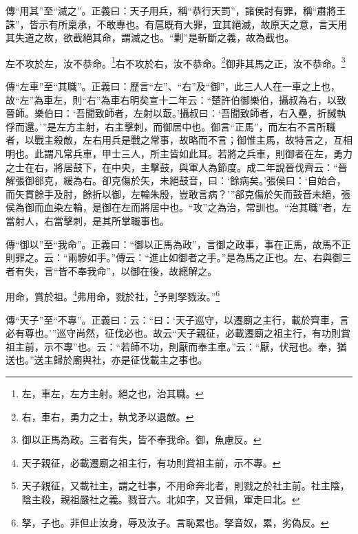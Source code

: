 {\noindent\zhuan{}\fzbyks 傳“用其”至“滅之”。正義曰：天子用兵，稱“恭行天罰”，諸侯討有罪，稱“肅將王誅”，皆示有所稟承，不敢專也。有扈既有大罪，宜其絕滅，故原天之意，言天用其失道之故，欲截絕其命，謂滅之也。“剿”是斬斷之義，故為截也。 \par}

左不攻於左，汝不恭命。\footnote{左，車左，左方主射。絕之也，治其職。}右不攻於右，汝不恭命。\footnote{右，車右，勇力之士，執戈矛以退敵。}御非其馬之正，汝不恭命。\footnote{御以正馬為政。三者有失，皆不奉我命。御，魚慮反。}


{\noindent\zhuan{}\fzbyks 傳“左車”至“其職”。正義曰：歷言“左”、“右”及“御”，此三人人在一車之上也，故“左”為車左，則“右”為車右明矣宣十二年云：“楚許伯御樂伯，攝叔為右，以致晉師。樂伯曰：‘吾聞致師者，左射以菆。’攝叔曰：‘吾聞致師者，右入壘，折馘執俘而還。’”是左方主射，右主擊刺，而御居中也。御言“正馬”，而左右不言所職者，以戰主殺敵，左右用兵是戰之常事，故略而不言；御惟主馬，故特言之，互相明也。此謂凡常兵車，甲士三人，所主皆如此耳。若將之兵車，則御者在左，勇力之士在右，將居鼓下，在中央，主擊鼓，與軍人為節度。成二年說晉伐齊云：“晉解張御郤克，緩為右。卻克傷於矢，未絕鼓音，曰：‘餘病矣。’張侯曰：‘自始合，而矢貫餘手及肘，餘折以御，左輪朱殷，豈敢言病？’”郤克傷於矢而鼓音未絕，張侯為御而血染左輪，是御在左而將居中也。“攻”之為治，常訓也。“治其職”者，左當射人，右當擊刺，是其所掌職事也。 \par}

{\noindent\zhuan{}\fzbyks 傳“御以”至“我命”。正義曰：“御以正馬為政”，言御之政事，事在正馬，故馬不正則罪之。云：“兩驂如手。”傳云：“進止如御者之手。”是為馬之正也。左、右與御三者有失，言“皆不奉我命”，以御在後，故總解之。 \par}

用命，賞於祖。\footnote{天子親征，必載遷廟之祖主行，有功則賞祖主前，示不專。}弗用命，戮於社，\footnote{天子親征，又載社主，謂之社事，不用命奔北者，則戮之於社主前。社主陰，陰主殺，親祖嚴社之義。戮音六。北如字，又音佩，軍走曰北。}予則孥戮汝。”\footnote{孥，子也。非但止汝身，辱及汝子。言恥累也。孥音奴，累，劣偽反。}

{\noindent\zhuan{}\fzbyks 傳“天子”至“不專”。正義曰：云：“曰：‘天子巡守，以遷廟之主行，載於齊車，言必有尊也。’”巡守尚然，征伐必也。故云“天子親征，必載遷廟之祖主行，有功則賞祖主前，示不專”也。云：“若師不功，則厭而奉主車。”云：“厭，伏冠也。奉，猶送也。”送主歸於廟與社，亦是征伐載主之事也。 \par}

